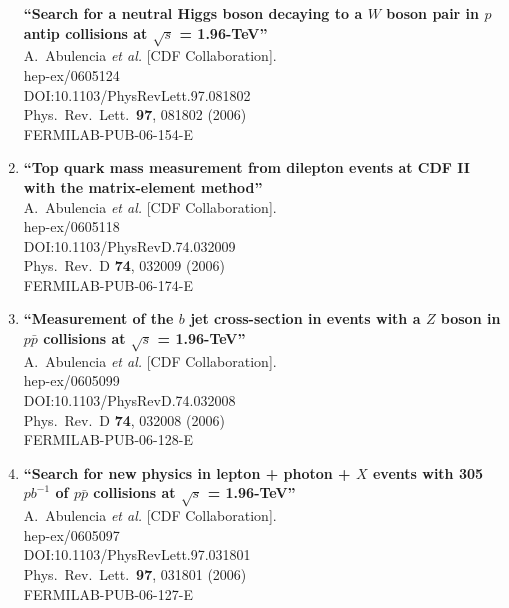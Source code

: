 \documentclass{article}
\begin{document}
\begin{enumerate}
{\bf ``Search for a neutral Higgs boson decaying to a $W$ boson pair in $p$ antip collisions at $\sqrt{s}$ = 1.96-TeV''}
  \\{}A.~Abulencia {\it et al.} [CDF Collaboration].
  \\{}hep-ex/0605124
  \\{}DOI:10.1103/PhysRevLett.97.081802
  \\{}Phys.\ Rev.\ Lett.\  {\bf 97}, 081802 (2006)
  \\{}FERMILAB-PUB-06-154-E
\item%
{\bf ``Top quark mass measurement from dilepton events at CDF II with the matrix-element method''}
  \\{}A.~Abulencia {\it et al.} [CDF Collaboration].
  \\{}hep-ex/0605118
  \\{}DOI:10.1103/PhysRevD.74.032009
  \\{}Phys.\ Rev.\ D {\bf 74}, 032009 (2006)
  \\{}FERMILAB-PUB-06-174-E
\item%
{\bf ``Measurement of the $b$ jet cross-section in events with a $Z$ boson in $p \bar{p}$ collisions at $\sqrt{s}$ = 1.96-TeV''}
  \\{}A.~Abulencia {\it et al.} [CDF Collaboration].
  \\{}hep-ex/0605099
  \\{}DOI:10.1103/PhysRevD.74.032008
  \\{}Phys.\ Rev.\ D {\bf 74}, 032008 (2006)
  \\{}FERMILAB-PUB-06-128-E
\item%
{\bf ``Search for new physics in lepton + photon + $X$ events with 305 $pb^{-1}$ of $p \bar{p}$ collisions at $\sqrt{s}$ = 1.96-TeV''}
  \\{}A.~Abulencia {\it et al.} [CDF Collaboration].
  \\{}hep-ex/0605097
  \\{}DOI:10.1103/PhysRevLett.97.031801
  \\{}Phys.\ Rev.\ Lett.\  {\bf 97}, 031801 (2006)
  \\{}FERMILAB-PUB-06-127-E

\end{enumerate}
\end{document}

